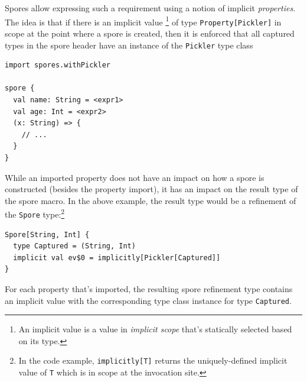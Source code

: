 \documentclass{llncs}
\begin{document}

Spores allow expressing such a requirement using a notion of implicit {\em
properties}. The idea is that if there is an implicit value
\footnote{An implicit value is a value in \textit{implicit scope} that's statically selected based on its type.}
of type \verb|Property[Pickler]| in scope at the
point where a spore is created, then it is enforced that all captured types in
the spore header have an instance of the \verb|Pickler| type class

\begin{lstlisting}
import spores.withPickler

spore {
  val name: String = <expr1>
  val age: Int = <expr2>
  (x: String) => {
    // ...
  }
}
\end{lstlisting}

While an imported property does not have an impact on how a spore is
constructed (besides the property import), it has an impact on the result type
of the spore macro. In the above example, the result type would be a
refinement of the \verb|Spore| type:\footnote{In the code example, \texttt{implicitly[T]} returns the uniquely-defined implicit value of \texttt{T} which is in scope at the invocation site.}


\begin{lstlisting}
Spore[String, Int] {
  type Captured = (String, Int)
  implicit val ev$0 = implicitly[Pickler[Captured]]
}
\end{lstlisting}

For each property that's imported, the resulting spore refinement type
contains an implicit value with the corresponding type class instance for type
\verb|Captured|.


\end{document}
